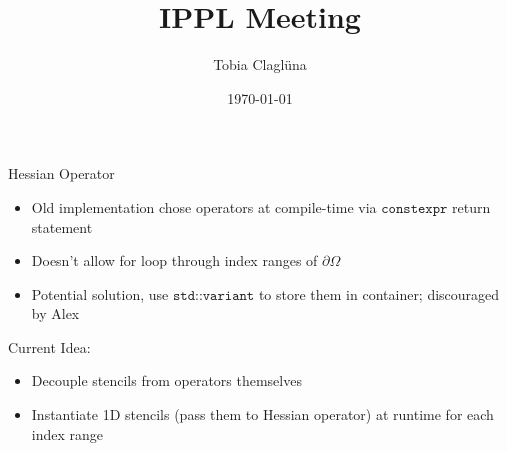

\title[\today]{IPPL Meeting}

\author{Tobia Claglüna}
\date{\today}
\def \myEmail {tobia.clagluena@psi.ch}





\begin{frame}[c]{Hessian Operator}
    \begin{itemize}
        \item Old implementation chose operators at compile-time via $\texttt{constexpr}$ return statement
        \item Doesn't allow for loop through index ranges of $\partial \Omega$
        \item Potential solution, use $\texttt{std::variant}$ to store them in container; discouraged by Alex
    \end{itemize}

    Current Idea: 
    \begin{itemize}
        \item Decouple stencils from operators themselves
        \item Instantiate 1D stencils (pass them to Hessian operator) at runtime for each index range
    \end{itemize}
\end{frame}

